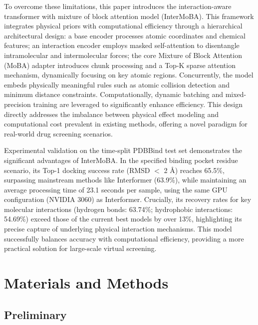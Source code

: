 \documentclass[11pt,a4paper]{article}
\begin{document}
To overcome these limitations, this paper introduces the interaction-aware transformer with mixture of block attention model (InterMoBA). This framework integrates physical priors with computational efficiency through a hierarchical architectural design\cite{paszke2019pytorch}: a base encoder processes atomic coordinates and chemical features\cite{xu2024surface}; an interaction encoder employs masked self-attention\cite{lee2018pre} to disentangle intramolecular and intermolecular forces; the core Mixture of Block Attention (MoBA) adapter introduces chunk processing and a Top-K\cite{lin2022survey} sparse attention mechanism, dynamically focusing on key atomic regions. Concurrently, the model embeds physically meaningful rules such as atomic collision detection and minimum distance constraints. Computationally, dynamic batching\cite{paszke2019pytorch} and mixed-precision training\cite{micikevicius2017mixed} are leveraged to significantly enhance efficiency. This design directly addresses the imbalance between physical effect modeling and computational cost prevalent in existing methods, offering a novel paradigm for real-world drug screening scenarios.

Experimental validation on the time-split PDBBind\cite{corso2022diffdock} test set demonstrates the significant advantages of InterMoBA. In the specified binding pocket residue scenario\cite{jain2024deep}, its Top-1 docking success rate (RMSD $<$ 2 \AA) reaches 65.5\%, surpassing mainstream methods like Interformer (63.9\%)\cite{lai2024interformer}, while maintaining an average processing time of 23.1 seconds per sample, using the same GPU configuration (NVIDIA 3060) as Interformer. Crucially, its recovery rates for key molecular interactions (hydrogen bonds: 63.74\%; hydrophobic interactions: 54.69\%) exceed those of the current best models by over 13\%, highlighting its precise capture of underlying physical interaction mechanisms. This model successfully balances accuracy with computational efficiency, providing a more practical solution for large-scale virtual screening.

\section{Materials and Methods}

\subsection{Preliminary}\label{AA}
\end{document}
